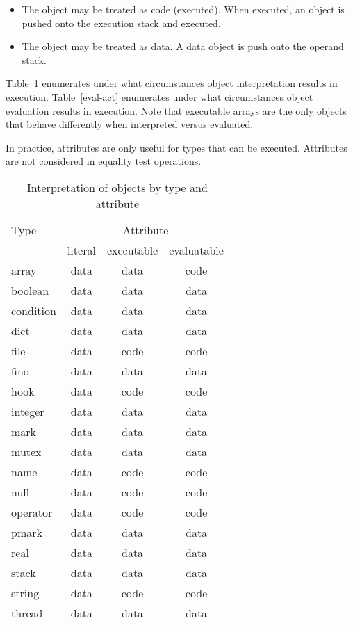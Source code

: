 \begin{itemize}
\item{The object may be treated as code (executed).  When executed, an object is
pushed onto the execution stack and executed.}
\item{The object may be treated as data.  A data object is push onto the operand
stack.}
\end{itemize}

Table~\ref{interp-act} enumerates under what circumstances object interpretation
results in execution.  Table~\ref{eval-act} enumerates under what circumstances
object evaluation results in execution.  Note that executable arrays are the
only objects that behave differently when interpreted versus evaluated.

In practice, attributes are only useful for types that can be executed.
Attributes are not considered in equality test operations.

\begin{table}[htb]
\begin{center}
\begin{tabular}{|l|c|c|c|}
\hline
Type		& \multicolumn{3}{|c|}{Attribute}	\\
\cline{2-4}
		& literal & executable & evaluatable	\\
\hline \hline
array		& data	& data	& code	\\
\hline
boolean		& data	& data	& data	\\
\hline
condition	& data	& data	& data	\\
\hline
dict		& data	& data	& data	\\
\hline
file		& data	& code	& code	\\
\hline
fino		& data	& data	& data	\\
\hline
hook		& data	& code	& code	\\
\hline
integer		& data	& data	& data	\\
\hline
mark		& data	& data	& data	\\
\hline
mutex		& data	& data	& data	\\
\hline
name		& data	& code	& code	\\
\hline
null		& data	& code	& code	\\
\hline
operator	& data	& code	& code	\\
\hline
pmark		& data	& data	& data	\\
\hline
real		& data	& data	& data	\\
\hline
stack		& data	& data	& data	\\
\hline
string		& data	& code	& code	\\
\hline
thread		& data	& data	& data	\\
\hline
\end{tabular}
\end{center}
\caption{\label{interp-act}
Interpretation of objects by type and attribute}
\end{table}

